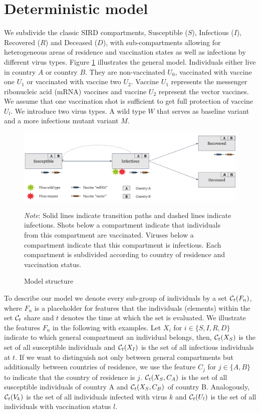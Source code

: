 \section{Deterministic model}
\label{sec:model}
We subdivide the classic SIRD compartments, Susceptible ($S$), Infectious ($I$), Recovered ($R$) and Deceased ($D$), with sub-compartments allowing for heterogeneous areas of residence and vaccination states as well as infections by different virus types. Figure \ref{fig:model} illustrates the general model. Individuals either live in country $A$ or country $B$. They are non-vaccinated $U_0$, vaccinated with vaccine one $U_1$ or vaccinated with vaccine two $U_2$. Vaccine $U_1$ represents the messenger ribonucleic acid (mRNA) vaccines and vaccine $U_2$ represent the vector vaccines. We assume that one vaccination shot is sufficient to get full protection of vaccine $U_l$. We introduce two virus types. A wild type $W$ that serves as baseline variant and a more infectious mutant variant $M$.\\
\begin{figure}[h!]
\centering
\includegraphics[scale=0.3]{images/vaccination_pp_blue_orange.png}\\
\begin{flushleft}
\scriptsize{\textit{Note}: Solid lines indicate transition paths and dashed lines indicate infections. Shots below a compartment indicate that individuals from this compartment are vaccinated. Viruses below a compartment indicate that this compartment is infectious. Each compartment is subdivided according to country of residence and vaccination status.}
\end{flushleft}
\caption{Model structure}
\label{fig:model}
\end{figure}

To describe our model we denote every sub-group of individuals by a set $\mathcal{C}_t(F_n)$, where $F_n$ is a placeholder for features that the individuals (elements) within the set $\mathcal{C}_t$ share and $t$ denotes the time at which the set is evaluated. We illustrate the features $F_n$ in the following with examples. Let $X_i$ for $i \in \{S, I, R, D \}$ indicate to which general compartment an individual belongs, then, $\mathcal{C}_t(X_S)$ is the set of all susceptible individuals and $\mathcal{C}_t(X_I)$ is the set of all infectious individuals at $t$. If we want to distinguish not only between general compartments but additionally between countries of residence, we use the feature $C_j$ for $j \in \{A, B\}$ to indicate that the country of residence is $j$. $\mathcal{C}_t(X_S, C_A)$ is the set of all susceptible individuals of country A and $\mathcal{C}_t(X_S, C_B)$ of country B. Analogously, $\mathcal{C}_t(V_k)$ is the set of all individuals infected with virus $k$ and $\mathcal{C}_t(U_l)$ is the set of all individuals with vaccination status $l$.\\

